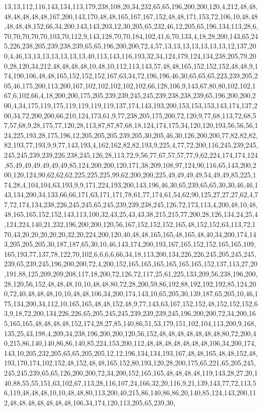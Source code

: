 13,13,112,116,143,134,113,179,238,108,20,34,232,65,65,196,200,200,120,4,212,48,48,48,48,48,48,48,167,200,143,170,48,48,165,167,167,152,48,48,171,153,72,106,10,48,48,48,48,48,152,66,34,200,143,143,203,12,30,205,65,232,46,12,205,65,196,134,113,28,6,70,70,70,70,70,103,70,112,9,143,128,70,70,184,102,41,6,70,133,4,18,28,200,143,65,245,226,238,205,239,238,239,65,65,196,200,200,72,4,57,13,13,13,13,13,13,13,12,137,200,4,46,13,13,13,13,13,13,13,40,113,143,116,193,32,34,124,179,124,134,238,205,79,200,28,120,34,212,48,48,48,48,10,48,10,112,113,143,57,48,48,165,152,152,152,48,48,9,174,190,106,48,48,165,152,152,152,167,63,34,72,196,196,46,30,65,65,65,223,239,205,205,46,175,200,113,200,167,102,102,102,102,102,66,128,106,9,143,67,80,80,102,102,167,6,102,66,4,18,200,200,175,205,239,239,245,245,239,238,238,239,65,196,200,200,200,4,34,175,119,175,119,119,119,119,137,174,143,193,200,153,153,153,143,174,137,200,34,72,200,200,66,210,124,173,61,9,77,238,205,175,200,72,120,9,77,68,113,72,68,57,57,68,9,28,175,77,120,28,113,87,87,87,68,18,124,174,175,34,120,120,193,56,56,56,124,225,193,28,175,196,12,205,205,205,239,205,30,205,46,30,126,200,200,77,82,82,82,82,193,77,193,9,9,77,143,193,4,162,162,82,82,193,9,225,4,77,72,200,116,245,239,245,245,245,239,239,226,238,245,126,28,113,72,9,56,77,67,57,57,77,9,62,224,174,174,124,85,49,49,49,49,49,49,85,124,200,200,120,171,38,209,108,97,124,90,116,65,143,200,200,120,124,90,62,62,62,225,225,225,99,62,200,200,225,49,49,49,49,54,49,49,85,225,174,28,4,104,104,63,193,9,9,171,224,193,200,143,196,46,30,65,239,65,65,30,30,46,46,143,134,200,34,133,66,66,171,63,171,171,78,61,77,174,61,54,62,90,125,27,27,27,62,4,77,72,174,134,238,226,245,245,65,245,239,239,238,245,126,72,173,113,4,200,48,10,48,48,165,165,152,152,143,113,100,32,43,25,43,43,38,215,215,77,200,28,126,134,24,25,4,124,224,140,21,232,196,200,200,120,56,167,152,152,152,165,48,152,152,63,113,72,170,43,20,20,20,20,20,32,20,224,200,120,40,48,48,165,165,48,165,48,40,34,200,174,143,205,205,205,30,187,187,65,30,10,46,143,174,200,193,167,165,152,152,165,165,109,165,193,77,137,78,122,70,102,6,6,6,6,66,34,18,113,200,134,226,226,245,205,245,245,239,65,239,245,196,200,200,72,4,200,152,165,165,165,165,165,165,152,137,113,27,20,191,88,125,209,209,208,117,18,200,72,126,72,117,25,61,225,133,209,56,238,196,200,28,120,56,152,48,48,48,10,10,48,48,80,72,28,200,59,86,192,88,192,192,192,85,124,200,72,40,48,48,48,10,10,48,48,106,34,200,174,143,10,65,205,30,139,187,65,205,10,46,175,134,200,34,112,10,165,165,48,48,152,48,9,77,143,63,167,152,152,48,152,152,152,63,9,18,72,200,134,226,226,65,205,245,245,239,239,239,245,196,200,200,72,34,200,165,165,165,48,48,48,48,152,174,28,27,85,140,86,51,53,179,151,102,104,113,200,9,168,135,25,43,198,4,209,34,238,196,200,200,120,56,152,48,48,48,48,48,48,48,80,72,200,40,215,86,140,140,86,86,140,85,224,153,200,112,48,48,48,48,48,48,48,106,34,200,174,143,10,205,232,205,65,65,205,205,12,12,196,134,134,193,167,48,48,165,48,48,152,48,193,170,174,102,152,48,152,48,48,165,152,80,193,120,28,200,175,65,221,65,205,245,245,245,239,65,65,126,200,200,72,34,200,152,165,165,48,48,48,48,119,143,28,27,20,140,88,55,55,151,63,102,67,113,28,116,107,24,166,32,20,116,9,21,139,143,77,72,113,56,119,48,48,48,10,10,48,48,80,113,200,40,215,86,140,86,86,20,140,85,124,143,200,112,48,48,48,48,48,48,48,106,34,174,120,113,205,65,239,30,